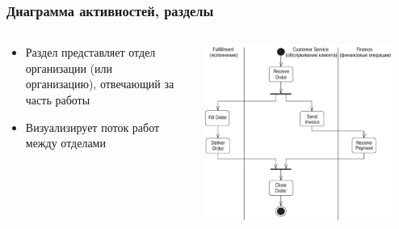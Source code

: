 \documentclass{../cscslides}
\begin{document}
    \begin{frame}
        \frametitle{Диаграмма активностей, разделы}
        \begin{columns}
            \begin{column}{0.5\textwidth}
                \begin{itemize}
                    \item Раздел представляет отдел организации (или организацию), отвечающий за часть работы
                    \item Визуализирует поток работ между отделами
                \end{itemize}
            \end{column}
            \begin{column}{0.5\textwidth}
                \begin{center}
                    \includegraphics[width=0.9\textwidth]{activitySwimlanes.png}
                \end{center}
            \end{column}
        \end{columns}
    \end{frame}
\end{document}
